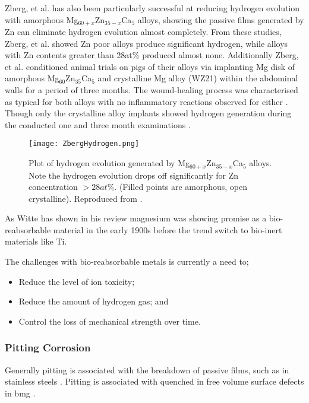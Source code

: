 \documentclass[a4paper,12pt,oneside]{report}%
\begin{document}
Zberg, et al. \cite{Zberg2009} has also been particularly successful at reducing hydrogen evolution with amorphous Mg$_{60+x}$Zn$_{35-x}$Ca$_{5}$ alloys, showing the passive films generated by Zn can eliminate hydrogen evolution almost completely. From these studies, Zberg, et al. \cite{Zberg2009} showed Zn poor alloys produce significant hydrogen, while alloys with Zn contents greater than 28at\% produced almost none. Additionally Zberg, et al. \cite{Zberg2009} conditioned animal trials on pigs of their alloys via implanting Mg disk of amorphous Mg$_{60}$Zn$_{35}$Ca$_{5}$ and crystalline Mg alloy (WZ21) within the abdominal walls for a period of three months. The wound-healing process was characterised as typical for both alloys with no inflammatory reactions observed for either \cite{Zberg2009}. Though only the crystalline alloy implants showed hydrogen generation during the conducted one and three month examinations \cite{Zberg2009}.

\begin{figure}[htbp]
	\centering
	\texttt{[image: ZbergHydrogen.png]}
	\caption[Plot of hydrogen evolution generated by Mg$_{60+x}$Zn$_{35-x}$Ca$_{5}$ alloys. Note the hydrogen evolution drops off significantly for Zn concentration $>28at\%$. (Filled points are amorphous, open crystalline).]{Plot of hydrogen evolution generated by Mg$_{60+x}$Zn$_{35-x}$Ca$_{5}$ alloys. Note the hydrogen evolution drops off significantly for Zn concentration $>28at\%$. (Filled points are amorphous, open crystalline). Reproduced from \cite{Zberg2009}.}
	\label{fig:ZbergHydrogen}
\end{figure}

As Witte \cite{Witte2010} has shown in his review magnesium was showing promise as a bio-reabsorbable material in the early 1900s before the trend switch to bio-inert materials like Ti. 

The challenges with bio-reabsorbable metals is currently a need to;

\begin{itemize}
	\item Reduce the level of ion toxicity;
	\item Reduce the amount of hydrogen gas; and
	\item Control the loss of mechanical strength over time. 
\end{itemize}

\subsubsection{Pitting Corrosion}
Generally pitting is associated with the breakdown of passive films, such as in stainless steels \cite{Zheng2014, Jones1992, Schweitzer2009}. Pitting is associated with quenched in free volume surface defects in \gls{bmg} \cite{Wang2012}. 
\end{document}
